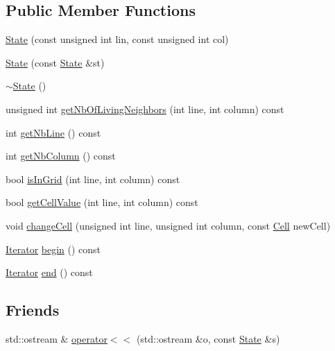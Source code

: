 \subsection*{Public Member Functions}
\begin{DoxyCompactItemize}
\item 
\mbox{\hyperlink{class_state_aa2771d8b47729a04ae5a29e7a62fcd8b}{State}} (const unsigned int lin, const unsigned int col)
\item 
\mbox{\hyperlink{class_state_a893ddf069c68f0b3b0b019f56787f6c5}{State}} (const \mbox{\hyperlink{class_state}{State}} \&st)
\item 
\mbox{\hyperlink{class_state_afab438d92b90dc18d194dbd9c9c8bab3}{$\sim$\+State}} ()
\item 
unsigned int \mbox{\hyperlink{class_state_a8c0e0ddedf2b60efdf27f78884cea0ae}{get\+Nb\+Of\+Living\+Neighbors}} (int line, int column) const
\item 
int \mbox{\hyperlink{class_state_a89f0f517cf988dd3ee1d952c853328d6}{get\+Nb\+Line}} () const
\item 
int \mbox{\hyperlink{class_state_ad46b1fe0d5693425fa4277d1f257cd11}{get\+Nb\+Column}} () const
\item 
bool \mbox{\hyperlink{class_state_aef7e65c5de780a3e933e1d145c67965e}{is\+In\+Grid}} (int line, int column) const
\item 
bool \mbox{\hyperlink{class_state_aecc33cac215cff3cad8b789bfc52c6b6}{get\+Cell\+Value}} (int line, int column) const
\item 
void \mbox{\hyperlink{class_state_abede2d4d10b22198b91d3392870c786d}{change\+Cell}} (unsigned int line, unsigned int column, const \mbox{\hyperlink{class_cell}{Cell}} new\+Cell)
\item 
\mbox{\hyperlink{class_state_1_1_iterator}{Iterator}} \mbox{\hyperlink{class_state_a586600f9cce93894c1804104db734cf6}{begin}} () const
\item 
\mbox{\hyperlink{class_state_1_1_iterator}{Iterator}} \mbox{\hyperlink{class_state_ab37b86dd38536debe44f82f8fff02eed}{end}} () const
\end{DoxyCompactItemize}
\subsection*{Friends}
\begin{DoxyCompactItemize}
\item 
std\+::ostream \& \mbox{\hyperlink{class_state_aa1b8f65fa23e0c5f68a6c236ef7e5653}{operator$<$$<$}} (std\+::ostream \&o, const \mbox{\hyperlink{class_state}{State}} \&s)
\end{DoxyCompactItemize}


